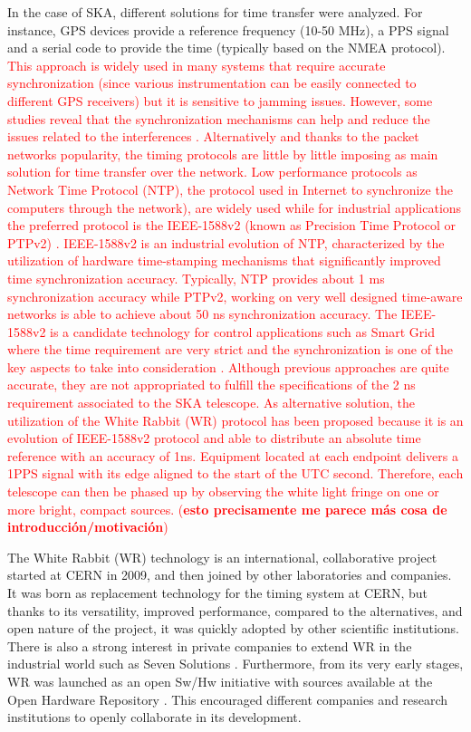 In the case of SKA, different solutions for time transfer were analyzed. For instance, GPS devices provide a reference frequency (10-50 MHz), a PPS signal and a serial code to provide the time (typically based on the NMEA protocol). \textcolor{red}{This approach is widely used in many systems that require accurate synchronization (since various instrumentation can be easily connected to different GPS receivers) but it is sensitive to jamming issues. However, some studies reveal that the synchronization mechanisms can help and reduce the issues related to the interferences \cite{NOURA2016130}.  Alternatively and thanks to the packet networks popularity, the timing protocols are little by little imposing as main solution for time transfer over the network. Low performance protocols as Network Time Protocol (NTP), the protocol used in Internet to synchronize the computers through the network), \cite{ntf:ntp_std} are widely used while for industrial applications the preferred protocol is the IEEE-1588v2 (known as Precision Time Protocol or PTPv2) \cite{ieee:ieee1588_std} \cite{itu:TG8275_1_Y_1369_1}. IEEE-1588v2 is an industrial evolution of NTP, characterized by the utilization of hardware time-stamping mechanisms that significantly improved time synchronization accuracy. Typically, NTP provides about 1 ms synchronization accuracy while PTPv2, working on very well designed time-aware networks is able to achieve about 50 ns synchronization accuracy. The IEEE-1588v2 is a candidate technology for control applications such as Smart Grid \cite{NAFI201623} where the time requirement are very strict and the synchronization is one of the key aspects to take into consideration \cite{COLAK2016396}.
Although previous approaches are quite accurate, they are not appropriated to fulfill the specifications of the 2 ns requirement associated to the SKA telescope. As alternative solution, the utilization of the White Rabbit (WR) protocol has been proposed because it is an evolution of IEEE-1588v2 protocol and able to distribute an absolute time reference with an accuracy of 1ns. Equipment located at each endpoint delivers a 1PPS signal with its edge aligned to the start of the UTC second. Therefore, each telescope can then be phased up by observing the white light fringe on one or more bright, compact sources. (\textbf{esto precisamente me parece más cosa de introducción/motivación})}

The White Rabbit  (WR) technology is an international, collaborative project started at CERN in 2009, and then joined by other laboratories and companies. It was born as replacement technology for the timing system at CERN, but thanks to its versatility, improved performance, compared to the alternatives, and open nature of the project, it was quickly adopted by other scientific institutions. There is also a strong interest in private companies to extend WR in the industrial world such as Seven Solutions \cite{sevensols:wr}. Furthermore, from its very early stages, WR was launched as an open Sw/Hw initiative with sources available at the Open Hardware Repository \cite{ohwr:repo}. This encouraged different companies and research institutions to openly collaborate in its development.

